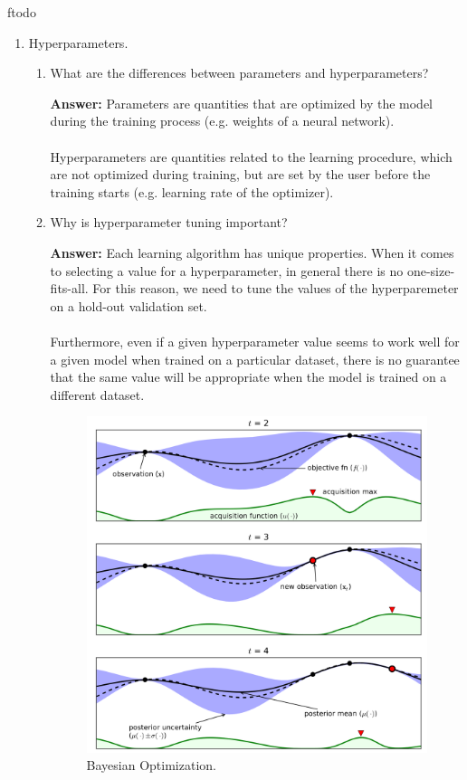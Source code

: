 ƒtodo\documentclass{article}
\newenvironment{QandA}{\begin{enumerate}[label=\arabic*.]}{\end{enumerate}}
\newenvironment{InnerQandA}{\begin{enumerate}[label=\roman*.]}{\end{enumerate}}
\newenvironment{answer}{\par\normalfont \textbf{Answer:}}{}
\begin{document}
\begin{QandA}
\begin{answer}
        (See more \href{https://blog.paperspace.com/intro-to-optimization-in-deep-learning-gradient-descent/}{here})
    \end{answer}

    \item Hyperparameters.
    \begin{InnerQandA}
        \item What are the differences between parameters and hyperparameters?
        \begin{answer}
            Parameters are quantities that are optimized by the model during the training process (e.g. weights of a neural network). \\\\
            Hyperparameters are quantities related to the learning procedure, which are not optimized during training, but are set by the user before the training starts (e.g. learning rate of the optimizer).
        \end{answer}

        \item Why is hyperparameter tuning important?
        \begin{answer}
            Each learning algorithm has unique properties. When it comes to selecting a value for a hyperparameter, in general there is no one-size-fits-all. For this reason, we need to tune the values of the hyperparemeter on a hold-out validation set. \\\\
            Furthermore, even if a given hyperparameter value seems to work well for a given model when trained on a particular dataset, there is no guarantee that the same value will be appropriate when the model is trained on a different dataset.
        \end{answer}
        \begin{figure}
            \centering
            \includegraphics[width=0.7\columnwidth]{img/bo.png}
            \caption{Bayesian Optimization\footnotemark.}
            \label{fig:bo}
        \end{figure}
        

\end{InnerQandA}
\end{QandA}
\end{document}
